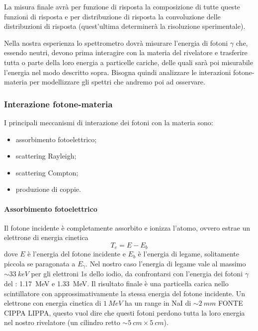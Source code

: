 La misura finale avrà per funzione di risposta la composizione di tutte queste funzioni di risposta e per distribuzione di risposta la convoluzione delle distribuzioni di risposta (quest'ultima determinerà la risoluzione sperimentale).

Nella nostra esperienza lo spettrometro dovrà misurare l'energia di fotoni $\gamma$ che, essendo neutri, devono prima interagire con la materia del rivelatore e trasferire tutta o parte della loro energia a particelle cariche, delle quali sarà poi misurabile l'energia nel modo descritto sopra. Bisogna quindi analizzare le interazioni fotone-materia per modellizzare gli spettri che andremo poi ad osservare.


\subsubsection{Interazione fotone-materia}
I principali meccanismi di interazione dei fotoni con la materia sono:
\begin{itemize}
	\item assorbimento fotoelettrico;
	\item scattering Rayleigh;
	\item scattering Compton;
	\item produzione di coppie.
\end{itemize}
  
 \paragraph{Assorbimento fotoelettrico}
 Il fotone incidente è completamente assorbito e ionizza l'atomo, ovvero estrae un elettrone di energia cinetica 
 \begin{equation} \label{eq:fotoelettrico}
 T_e = E - E_b
 \end{equation} 
 dove $E$ è l'energia del fotone incidente e $E_b$ è l'energia di legame, solitamente piccola se paragonata a $E_{\gamma}$. Nel nostro caso l'energia di legame vale al massimo $\sim \SI{33}{keV}$ per gli elettroni 1s dello iodio, da confrontarsi con l'energia dei fotoni $\gamma$ del \co\;: \SI{1.17}{MeV} e \SI{1.33}{MeV}. Il risultato finale è una particella carica nello scintillatore con approssimativamente la stessa energia del fotone incidente.
 Un elettrone con energia cinetica di $\SI{1}{MeV}$ ha un range in NaI di $\sim \SI{2}{mm}$ FONTE CIPPA LIPPA, questo vuol dire che questi fotoni perdono tutta la loro energia nel nostro rivelatore (un cilindro retto $\sim \SI{5}{cm} \times \SI{5}{cm}$). 

